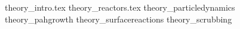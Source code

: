 {theory_intro.tex}
{theory_reactors.tex}
{theory_particledynamics}
{theory_pahgrowth}
{theory_surfacereactions}
{theory_scrubbing}